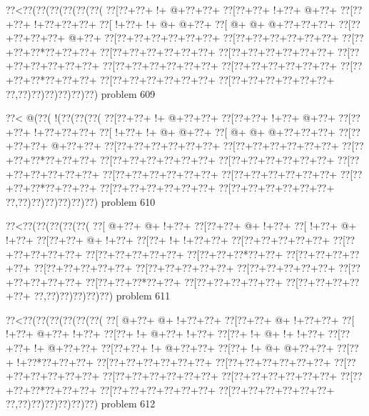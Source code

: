 \vbox{\vbox{\goo
\0??<\0??(\0??(\0??(\0??(\0??(\0??(
\0??[\0??+\0??+\- !+\- @+\0??+\0??+
\0??[\0??+\0??+\- !+\0??+\- @+\0??+
\0??[\0??+\0??+\- !+\0??+\0??+\0??+
\0??[\- !+\0??+\- !+\- @+\- @+\0??+
\0??[\- @+\- @+\- @+\0??+\0??+\0??+
\0??[\0??+\0??+\0??+\0??+\- @+\0??+
\0??[\0??+\0??+\0??+\0??+\0??+\0??+
\0??[\0??+\0??+\0??+\0??+\0??+\0??+
\0??[\0??+\0??+\0??*\0??+\0??+\0??+
\0??[\0??+\0??+\0??+\0??+\0??+\0??+
\0??[\0??+\0??+\0??+\0??+\0??+\0??+
\0??[\0??+\0??+\0??+\0??+\0??+\0??+
\0??[\0??+\0??+\0??+\0??+\0??+\0??+
\0??[\0??+\0??+\0??+\0??+\0??+\0??+
\0??[\0??+\0??+\0??*\0??+\0??+\0??+
\0??[\0??+\0??+\0??+\0??+\0??+\0??+
\0??[\0??+\0??+\0??+\0??+\0??+\0??+
\0??,\0??)\0??)\0??)\0??)\0??)\0??)
}
\hfil problem 609\hfil\break
}

\vbox{\vbox{\goo
\0??<\- @(\0??(\- !(\0??(\0??(\0??(
\0??[\0??+\0??+\- !+\- @+\0??+\0??+
\0??[\0??+\0??+\- !+\0??+\- @+\0??+
\0??[\0??+\0??+\- !+\0??+\0??+\0??+
\0??[\- !+\0??+\- !+\- @+\- @+\0??+
\0??[\- @+\- @+\- @+\0??+\0??+\0??+
\0??[\0??+\0??+\0??+\- @+\0??+\0??+
\0??[\0??+\0??+\0??+\0??+\0??+\0??+
\0??[\0??+\0??+\0??+\0??+\0??+\0??+
\0??[\0??+\0??+\0??*\0??+\0??+\0??+
\0??[\0??+\0??+\0??+\0??+\0??+\0??+
\0??[\0??+\0??+\0??+\0??+\0??+\0??+
\0??[\0??+\0??+\0??+\0??+\0??+\0??+
\0??[\0??+\0??+\0??+\0??+\0??+\0??+
\0??[\0??+\0??+\0??+\0??+\0??+\0??+
\0??[\0??+\0??+\0??*\0??+\0??+\0??+
\0??[\0??+\0??+\0??+\0??+\0??+\0??+
\0??[\0??+\0??+\0??+\0??+\0??+\0??+
\0??,\0??)\0??)\0??)\0??)\0??)\0??)
}
\hfil problem 610\hfil\break
}

\vbox{\vbox{\goo
\0??<\0??(\0??(\0??(\0??(\0??(
\0??[\- @+\0??+\- @+\- !+\0??+
\0??[\0??+\0??+\- @+\- !+\0??+
\0??[\- !+\0??+\- @+\- !+\0??+
\0??[\0??+\0??+\- @+\- !+\0??+
\0??[\0??+\- !+\- !+\0??+\0??+
\0??[\0??+\0??+\0??+\0??+\0??+
\0??[\0??+\0??+\0??+\0??+\0??+
\0??[\0??+\0??+\0??+\0??+\0??+
\0??[\0??+\0??+\0??*\0??+\0??+
\0??[\0??+\0??+\0??+\0??+\0??+
\0??[\0??+\0??+\0??+\0??+\0??+
\0??[\0??+\0??+\0??+\0??+\0??+
\0??[\0??+\0??+\0??+\0??+\0??+
\0??[\0??+\0??+\0??+\0??+\0??+
\0??[\0??+\0??+\0??*\0??+\0??+
\0??[\0??+\0??+\0??+\0??+\0??+
\0??[\0??+\0??+\0??+\0??+\0??+
\0??,\0??)\0??)\0??)\0??)\0??)
}
\hfil problem 611\hfil\break
}

\vbox{\vbox{\goo
\0??<\0??(\0??(\0??(\0??(\0??(\0??(
\0??[\- @+\0??+\- @+\- !+\0??+\0??+
\0??[\0??+\0??+\- @+\- !+\0??+\0??+
\0??[\- !+\0??+\- @+\0??+\- !+\0??+
\0??[\0??+\- !+\- @+\0??+\- !+\0??+
\0??[\0??+\- !+\- @+\- !+\- !+\0??+
\0??[\0??+\0??+\- !+\- @+\0??+\0??+
\0??[\0??+\0??+\- !+\- @+\0??+\0??+
\0??[\0??+\- !+\- @+\- @+\0??+\0??+
\0??[\0??+\- !+\0??*\0??+\0??+\0??+
\0??[\0??+\0??+\0??+\0??+\0??+\0??+
\0??[\0??+\0??+\0??+\0??+\0??+\0??+
\0??[\0??+\0??+\0??+\0??+\0??+\0??+
\0??[\0??+\0??+\0??+\0??+\0??+\0??+
\0??[\0??+\0??+\0??+\0??+\0??+\0??+
\0??[\0??+\0??+\0??*\0??+\0??+\0??+
\0??[\0??+\0??+\0??+\0??+\0??+\0??+
\0??[\0??+\0??+\0??+\0??+\0??+\0??+
\0??,\0??)\0??)\0??)\0??)\0??)\0??)
}
\hfil problem 612\hfil\break
}

